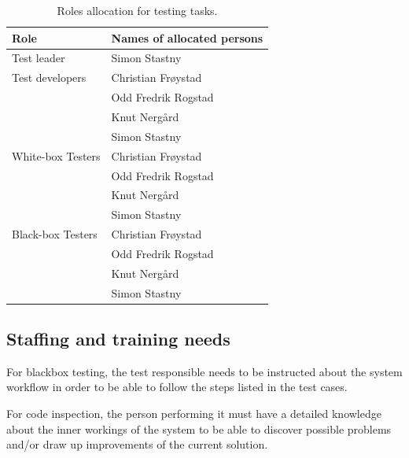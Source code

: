 \documentclass[11pt]{book}
\begin{document}
\begin{table}[H]
    \centering
    \begin{tabular}{| l | l |}
        \hline
        Role                & Names of allocated persons    \\ \hline

        Test leader         & Simon Stastny                 \\ \hline

        Test developers     & Christian Frøystad            \\
                            & Odd Fredrik Rogstad           \\
                            & Knut Nergård                  \\
                            & Simon Stastny                 \\ \hline

        White-box Testers   & Christian Frøystad            \\
                            & Odd Fredrik Rogstad           \\
                            & Knut Nergård                  \\
                            & Simon Stastny                 \\ \hline

        Black-box Testers   & Christian Frøystad            \\
                            & Odd Fredrik Rogstad           \\
                            & Knut Nergård                  \\
                            & Simon Stastny                 \\ \hline
    \end{tabular}
    \caption{Roles allocation for testing tasks.}
    \label{tab:test_plan_roles_allocation}
\end{table}

\subsection{Staffing and training needs}
For blackbox testing, the test responsible needs to be instructed about the system workflow in order to be able to follow the steps listed in the test cases.

For code inspection, the person performing it must have a detailed knowledge about the inner workings of the system to be able to discover possible problems and/or draw up improvements of the current solution.
\end{document}
